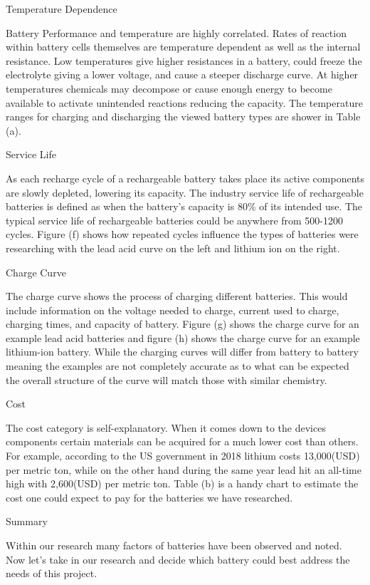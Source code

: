 Temperature Dependence 

Battery Performance and temperature are highly correlated. Rates of reaction within battery cells themselves are temperature dependent as well as the internal resistance. Low temperatures give higher resistances in a battery, could freeze the electrolyte giving a lower voltage, and cause a steeper discharge curve. At higher temperatures chemicals may decompose or cause enough energy to become available to activate unintended reactions reducing the capacity. The temperature ranges for charging and discharging the viewed battery types are shower in Table (a). 

Service Life 

As each recharge cycle of a rechargeable battery takes place its active components are slowly depleted, lowering its capacity. The industry service life of rechargeable batteries is defined as when the battery's capacity is 80\% of its intended use. The typical service life of rechargeable batteries could be anywhere from 500-1200 cycles. Figure (f) shows how repeated cycles influence the types of batteries were researching with the lead acid curve on the left and lithium ion on the right. 

Charge Curve 

The charge curve shows the process of charging different batteries. This would include information on the voltage needed to charge, current used to charge, charging times, and capacity of battery. Figure (g) shows the charge curve for an example lead acid batteries and figure (h) shows the charge curve for an example lithium-ion battery. While the charging curves will differ from battery to battery meaning the examples are not completely accurate as to what can be expected the overall structure of the curve will match those with similar chemistry. 

Cost 

The cost category is self-explanatory. When it comes down to the devices components certain materials can be acquired for a much lower cost than others. For example, according to the US government in 2018 lithium costs 13,000(USD) per metric ton, while on the other hand during the same year lead hit an all-time high with 2,600(USD) per metric ton. Table (b) is a handy chart to estimate the cost one could expect to pay for the batteries we have researched. 

Summary 

Within our research many factors of batteries have been observed and noted. Now let's take in our research and decide which battery could best address the needs of this project. 

